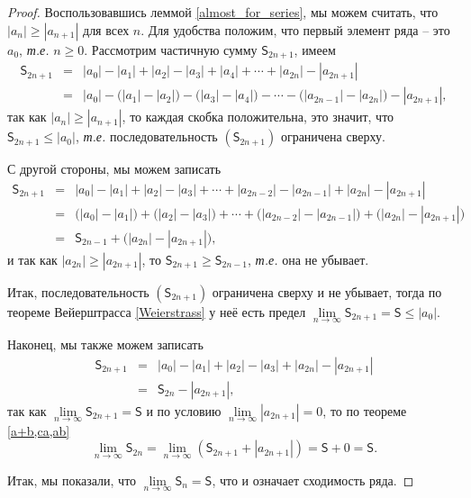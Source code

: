 \begin{proof}
Воспользовавшись леммой \ref{almost_for_series}, мы можем считать, что $|a_n| \ge |a_{n+1}|$ для всех $n$. Для удобства положим, что первый элемент ряда -- это $a_0$, \textit{т.е.} $n \ge 0$. Рассмотрим частичную сумму $\mathsf{S}_{2n+1}$, имеем
\begin{eqnarray*}
    \mathsf{S}_{2n+1} &=& |a_0| - |a_1| + |a_2| - |a_3| + |a_4| + \cdots  + |a_{2n}| - |a_{2n+1}| \\
    &=& |a_0| - \bigl(|a_1| - |a_2|\bigr) - \bigl(|a_3| - |a_4|\bigr) - \cdots - \bigl(|a_{2n-1}|-  |a_{2n}|\bigr) - |a_{2n+1}|,
\end{eqnarray*}
так как $|a_n| \ge |a_{n+1}|$, то каждая скобка положительна, это значит, что $\mathsf{S}_{2n+1} \le |a_0|$, \textit{т.е.} последовательность $(\mathsf{S}_{2n+1})$ ограничена сверху.

С другой стороны, мы можем записать
\begin{eqnarray*}
    \mathsf{S}_{2n+1} &=& |a_0| - |a_1| + |a_2| - |a_3| + \cdots  + |a_{2n-2}| - |a_{2n-1}| + |a_{2n}| - |a_{2n+1}| \\
    &=& \bigl(|a_0| - |a_1| \bigr) + \bigl(|a_2|-|a_3| \bigr) + \cdots + \bigl( |a_{2n-2}| - |a_{2n-1}|\bigr)+ \bigl(|a_{2n}| - |a_{2n+1}|\bigr) \\
    &=& \mathsf{S}_{2n-1} + \bigl(|a_{2n}| - |a_{2n+1}|\bigr),
\end{eqnarray*}
и так как $|a_{2n}| \ge |a_{2n+1}|$, то $\mathsf{S}_{2n+1} \ge \mathsf{S}_{2n-1}$, \textit{т.е.} она не убывает.

Итак, последовательность $(\mathsf{S}_{2n+1})$ ограничена сверху и не убывает, тогда по теореме Вейерштрасса \ref{Weierstrass} у неё есть предел $\lim\limits_{n \to \infty}\mathsf{S}_{2n+1} = \mathsf{S} \le |a_0|.$

Наконец, мы также можем записать
\begin{eqnarray*}
    \mathsf{S}_{2n+1} &=& |a_0| - |a_1| + |a_2| - |a_3| +  |a_{2n}| - |a_{2n+1}| \\
    &=& \mathsf{S}_{2n}  - |a_{2n+1}|,
\end{eqnarray*}
так как $\lim\limits_{n \to \infty}\mathsf{S}_{2n+1} = \mathsf{S}$ и по условию $\lim\limits_{n\to \infty} |a_{2n+1}| = 0$, то по теореме \ref{a+b,ca,ab}
\[
 \lim_{n\to \infty}\mathsf{S}_{2n}  = \lim_{n\to \infty} \left( \mathsf{S}_{2n+1} + |a_{2n+1}| \right) = \mathsf{S} + 0 = \mathsf{S}.
\]

Итак, мы показали, что $\lim\limits_{n \to \infty}\mathsf{S}_n = \mathsf{S}$, что и означает сходимость ряда.
\end{proof}

